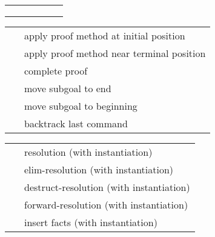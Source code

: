 \begin{isabellebody}
\begin{isamarkuptext}
\begin{tabular}{l|lllll}
    \mbox{\isa{simp}}
      &                &                    &                      & \isa{{\isasymtimes}}         & \isa{{\isasymtimes}} \\
    \mbox{\isa{cong}}
      &                &                    &                      & \isa{{\isasymtimes}}         & \isa{{\isasymtimes}} \\
    \mbox{\isa{split}}
      &                &                    &                      & \isa{{\isasymtimes}}         & \isa{{\isasymtimes}} \\
  \end{tabular}%
\end{isamarkuptext}%
\isamarkuptrue%
%
\isamarkuptrue%
%
\isamarkuptrue%
%
\begin{isamarkuptext}%
\begin{tabular}{ll}
    \mbox{\isa{\isacommand{apply}}}~\isa{m} & apply proof method at initial position \\
    \mbox{\isa{\isacommand{apply{\isacharunderscore}end}}}~\isa{m} & apply proof method near terminal position \\
    \mbox{\isa{\isacommand{done}}} & complete proof \\
    \mbox{\isa{\isacommand{defer}}}~\isa{n} & move subgoal to end \\
    \mbox{\isa{\isacommand{prefer}}}~\isa{n} & move subgoal to beginning \\
    \mbox{\isa{\isacommand{back}}} & backtrack last command \\
  \end{tabular}%
\end{isamarkuptext}%
\isamarkuptrue%
%
\isamarkuptrue%
%
\begin{isamarkuptext}%
\begin{tabular}{ll}
    \mbox{\isa{rule{\isacharunderscore}tac}}~\isa{insts} & resolution (with instantiation) \\
    \mbox{\isa{erule{\isacharunderscore}tac}}~\isa{insts} & elim-resolution (with instantiation) \\
    \mbox{\isa{drule{\isacharunderscore}tac}}~\isa{insts} & destruct-resolution (with instantiation) \\
    \mbox{\isa{frule{\isacharunderscore}tac}}~\isa{insts} & forward-resolution (with instantiation) \\
    \mbox{\isa{cut{\isacharunderscore}tac}}~\isa{insts} & insert facts (with instantiation) \\

\end{tabular}
\end{isamarkuptext}
\end{isabellebody}
